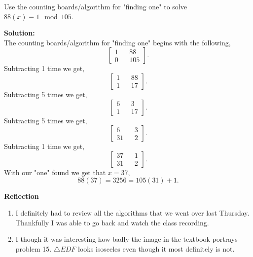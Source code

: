 \documentclass[12pt]{article}
\makeatletter
\theoremstyle{homework}
\newenvironment{exercise}[1]
{\def\@currentlabel{#1}\exercisecore}
{\endexercisecore}
\newcommand{\localhead}[1]{\par\smallskip\noindent\textbf{#1}\nobreak\\}%
\newcommand\solution{\localhead{Solution:}}
\makeatother
\begin{document}
\vspace{.5in}



\begin{exercise}{3} Use the counting boards/algorithm for "finding one" to solve $88(x) \equiv 1 \mod 105$.\\
  \solution

  The counting boards/algorithm for "finding one" begins with the following, 
  \begin{equation*}
  \begin{bmatrix}
    1 && 88\\
    0 && 105
  \end{bmatrix}.
\end{equation*}
Subtracting 1 time we get,
\begin{equation*}
  \begin{bmatrix}
    1 && 88\\
    1 && 17
  \end{bmatrix}.
\end{equation*}
Subtracting 5 times we get,
\begin{equation*}
  \begin{bmatrix}
    6 && 3\\
    1 && 17
  \end{bmatrix}.
\end{equation*}
Subtracting 5 times we get,
\begin{equation*}
  \begin{bmatrix}
    6 && 3\\
    31 && 2
  \end{bmatrix}.
\end{equation*}
Subtracting 1 time we get,
\begin{equation*}
  \begin{bmatrix}
    37 && 1\\
    31 && 2
  \end{bmatrix}.
\end{equation*}
With our "one" found we get that $x = 37$, 
\begin{equation*}
  88(37) = 3256 = 105(31) + 1.
\end{equation*}
\end{exercise}
\vspace{.5in}



\textbf{Reflection}
\begin{enumerate}
  \item I definitely had to review all the algorithms that we went over last Thursday. Thankfully I was 
  able to go back and watch the class recording. 
  
  \item I though it was interesting how badly the image in the textbook portrays problem 15. $\triangle EDF$ looks 
  isosceles even though it most definitely is not.

\end{enumerate}
\end{document}

